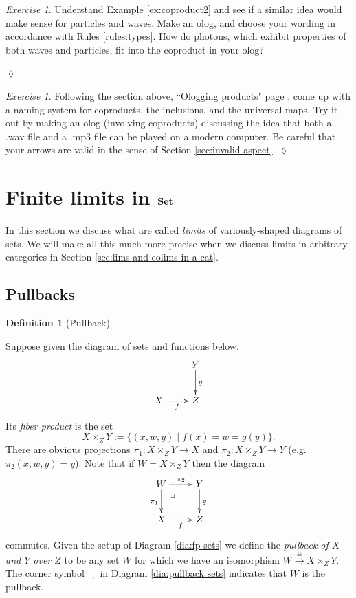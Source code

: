 \documentclass{book}
\makeatletter
\def\to{\rightarrow}
\def\taking{\colon}
\def\iso{\cong}
\def\|{{\;|\;}}
\def\ullimit{\ar@{}[rd]|(.3)*+{\lrcorner}}
\newcommand{\To}[1]{\xrightarrow{#1}}
\def\Set{{\bf Set}}
\theoremstyle{remark}
\newtheorem{exc}[subsubsection]{Exercise}
\newenvironment{exercise}{\begin{exc}}{\hspace*{\fill}$\lozenge$\end{exc}}
\theoremstyle{definition}
\newtheorem{definition}[subsubsection]{Definition}
\makeatother
\begin{document}
\begin{exercise}

Understand Example \ref{ex:coproduct2} and see if a similar idea would make sense for particles and waves. Make an olog, and choose your wording in accordance with Rules \ref{rules:types}. How do photons, which exhibit properties of both waves and particles, fit into the coproduct in your olog?

\end{exercise}

\begin{exercise}
Following the section above, ``Ologging products" page \pageref{sec:ologging products}, come up with a naming system for coproducts, the inclusions, and the universal maps. Try it out by making an olog (involving coproducts) discussing the idea that both a .wav file and a .mp3 file can be played on a modern computer. Be careful that your arrows are valid in the sense of Section \ref{sec:invalid aspect}.
\end{exercise}


\section{Finite limits in $\Set$}\label{sec:finite limits}

In this section we discuss what are called {\em limits} of variously-shaped diagrams of sets. We will make all this much more precise when we discuss limits in arbitrary categories in Section \ref{sec:lims and colims in a cat}.


\subsection{Pullbacks}

\begin{definition}[Pullback]\label{def:pullback}

Suppose given the diagram of sets and functions below.
\begin{align}\label{dia:fp sets}
\xymatrix{&Y\ar[d]^g\\
X\ar[r]_f&Z}
\end{align}
Its {\em fiber product} is the set 
$$X\times_ZY:=\{(x,w,y)\|f(x)=w=g(y)\}.$$ There are obvious projections $\pi_1\taking X\times_ZY\to X$ and $\pi_2\taking X\times_ZY\to Y$ (e.g. $\pi_2(x,w,y)=y$). Note that if $W=X\times_ZY$ then the diagram 
\begin{align}\label{dia:pullback sets}
\xymatrix{W\ullimit\ar[r]^-{\pi_2}\ar[d]_{\pi_1}&Y\ar[d]^g\\
X\ar[r]_f&Z}
\end{align}
commutes. Given the setup of Diagram \ref{dia:fp sets} we define the {\em pullback of $X$ and $Y$ over $Z$} to be any set $W$ for which we have an isomorphism $W\To{\iso}X\times_ZY$. The corner symbol $\lrcorner$ in Diagram \ref{dia:pullback sets} indicates that $W$ is the pullback.

\end{definition}
\end{document}
